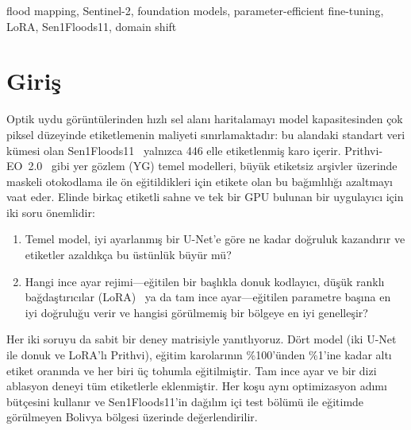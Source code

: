 \documentclass[conference]{IEEEtran}
\renewcommand{\abstractname}{Özetçe}%
\renewcommand{\IEEEkeywordsname}{Anahtar Kelimeler}}
\begin{document}
\begingroup
\renewcommand{\abstractname}{Abstract}
\renewcommand{\IEEEkeywordsname}{Keywords}
\begin{abstract}
Earth-observation foundation models are expected to reduce the number of labels needed for flood mapping. We test this on Sen1Floods11 by comparing two U-Nets (scratch and ImageNet-initialized) with Prithvi-EO~2.0 under frozen, LoRA and full fine-tuning, using the same six Sentinel-2 bands, the same optimizer-step budget, 1\,\%--100\,\% of the training labels and three seeds (\nruns{} runs). The U-Nets lead at every label fraction (0.829 vs.\ 0.767 water IoU at full labels, 0.809 vs.\ 0.704 with three labeled chips), so the gap widens as labels become scarce. LoRA matches full fine-tuning with about 140$\times$ fewer trainable parameters, and pretraining does not reduce the accuracy drop on the held-out Bolivia region. A pixel-level error analysis locates the foundation model's shortfall at water edges and on water bodies below 0.1\,km$^2$, consistent with its 16-pixel patch resolution.
\end{abstract}
\begin{IEEEkeywords}
flood mapping, Sentinel-2, foundation models, parameter-efficient fine-tuning, LoRA, Sen1Floods11, domain shift
\end{IEEEkeywords}
\endgroup

\section{Giriş}
Optik uydu görüntülerinden hızlı sel alanı haritalamayı model kapasitesinden çok piksel düzeyinde etiketlemenin maliyeti sınırlamaktadır: bu alandaki standart veri kümesi olan Sen1Floods11~\cite{bonafilia2020sen1floods11} yalnızca 446 elle etiketlenmiş karo içerir. Prithvi-EO~2.0~\cite{szwarcman2024prithvi} gibi yer gözlem (YG) temel modelleri, büyük etiketsiz arşivler üzerinde maskeli otokodlama ile ön eğitildikleri için etikete olan bu bağımlılığı azaltmayı vaat eder. Elinde birkaç etiketli sahne ve tek bir GPU bulunan bir uygulayıcı için iki soru önemlidir:
\begin{enumerate}
  \item Temel model, iyi ayarlanmış bir U-Net'e göre ne kadar doğruluk kazandırır ve etiketler azaldıkça bu üstünlük büyür mü?
  \item Hangi ince ayar rejimi---eğitilen bir başlıkla donuk kodlayıcı, düşük ranklı bağdaştırıcılar (LoRA)~\cite{hu2021lora} ya da tam ince ayar---eğitilen parametre başına en iyi doğruluğu verir ve hangisi görülmemiş bir bölgeye en iyi genelleşir?
\end{enumerate}
Her iki soruyu da sabit bir deney matrisiyle yanıtlıyoruz. Dört model (iki U-Net ile donuk ve LoRA'lı Prithvi), eğitim karolarının \%100'ünden \%1'ine kadar altı etiket oranında ve her biri üç tohumla eğitilmiştir. Tam ince ayar ve bir dizi ablasyon deneyi tüm etiketlerle eklenmiştir. Her koşu aynı optimizasyon adımı bütçesini kullanır ve Sen1Floods11'in dağılım içi test bölümü ile eğitimde görülmeyen Bolivya bölgesi üzerinde değerlendirilir.
\end{document}
